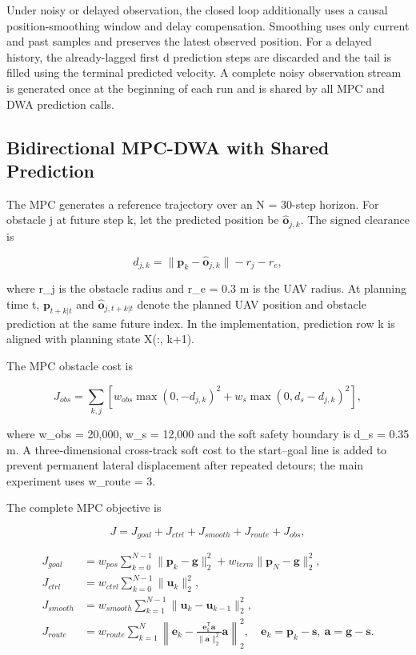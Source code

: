 \documentclass[10pt,a4paper]{article}
\begin{document}
Under noisy or delayed observation, the closed loop additionally uses a causal position-smoothing window and delay compensation. Smoothing uses only current and past samples and preserves the latest observed position. For a delayed history, the already-lagged first d prediction steps are discarded and the tail is filled using the terminal predicted velocity. A complete noisy observation stream is generated once at the beginning of each run and is shared by all MPC and DWA prediction calls.

\subsection{Bidirectional MPC-DWA with Shared Prediction}

The MPC generates a reference trajectory over an N = 30-step horizon. For obstacle j at future step k, let the predicted position be \(\hat{\mathbf{o}}_{j,k}\). The signed clearance is

\[
d_{j,k}=\|\mathbf{p}_k-\hat{\mathbf{o}}_{j,k}\|-r_j-r_e,
\]

where r\_j is the obstacle radius and r\_e = 0.3 m is the UAV radius. At planning time t, \(\mathbf{p}_{t+k|t}\) and \(\hat{\mathbf{o}}_{j,t+k|t}\) denote the planned UAV position and obstacle prediction at the same future index. In the implementation, prediction row k is aligned with planning state X(:, k+1).

The MPC obstacle cost is

\[
J_{obs}=\sum_{k,j}\left[w_{obs}\max(0,-d_{j,k})^2
+w_s\max(0,d_s-d_{j,k})^2\right],
\]

where w\_obs = 20,000, w\_s = 12,000 and the soft safety boundary is d\_s = 0.35 m. A three-dimensional cross-track soft cost to the start–goal line is added to prevent permanent lateral displacement after repeated detours; the main experiment uses w\_route = 3.

The complete MPC objective is

\[
J=J_{goal}+J_{ctrl}+J_{smooth}+J_{route}+J_{obs},
\]

\[
\begin{aligned}
J_{goal}&=w_{pos}\sum_{k=0}^{N-1}\|\mathbf p_k-\mathbf g\|_2^2+w_{term}\|\mathbf p_N-\mathbf g\|_2^2,\\
J_{ctrl}&=w_{ctrl}\sum_{k=0}^{N-1}\|\mathbf u_k\|_2^2,\\
J_{smooth}&=w_{smooth}\sum_{k=1}^{N-1}\|\mathbf u_k-\mathbf u_{k-1}\|_2^2,\\
J_{route}&=w_{route}\sum_{k=1}^{N}\left\|\mathbf e_k-\frac{\mathbf e_k^{\mathsf T}\mathbf a}{\|\mathbf a\|_2^2}\mathbf a\right\|_2^2,
\quad \mathbf e_k=\mathbf p_k-\mathbf s,\ \mathbf a=\mathbf g-\mathbf s.
\end{aligned}
\]
\end{document}
